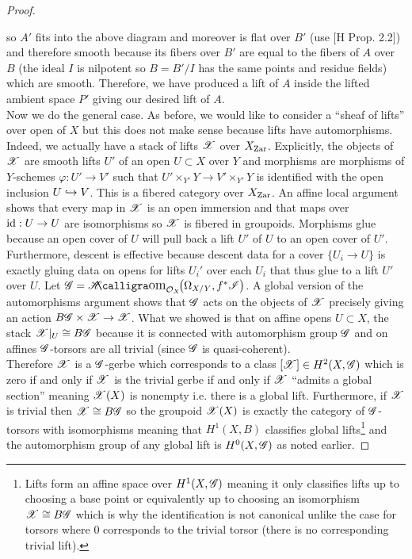 \documentclass[12pt]{article}
\begin{document}
\begin{proof}
\begin{center}
\end{center}
so $A'$ fits into the above diagram and moreover is flat over $B'$ (use [H Prop. 2.2]) and therefore smooth because its fibers over $B'$ are equal to the fibers of $A$ over $B$ (the ideal $I$ is nilpotent so $B = B'/I$ has the same points and residue fields) which are smooth. Therefore, we have produced a lift of $A$ inside the lifted ambient space $P'$ giving our desired lift of $A$. 
\bigskip\\
Now we do the general case. As before, we would like to consider a ``sheaf of lifts'' over open of $X$ but this does not make sense because lifts have automorphisms. Indeed, we actually have a stack of lifts $\mathscr{X}$ over $X_{\mathrm{Zar}}$. Explicitly, the objects of $\mathscr{X}$ are smooth lifts $U'$ of an open $U \subset X$ over $Y$ and morphisms are morphisms of $Y$-schemes $\varphi : U' \to V'$ such that $U' \times_{Y'} Y \to V' \times_{Y'} Y$ is identified with the open inclusion $U \hookrightarrow V$. This is a fibered category over $X_{\mathrm{Zar}}$. An affine local argument shows that every map in $\mathscr{X}$ is an open immersion and that maps over $\mathrm{id} : U \to U$ are isomorphisms so $\mathscr{X}$ is fibered in groupoids. Morphisms glue because an open cover of $U$ will pull back a lift $U'$ of $U$ to an open cover of $U'$. Furthermore, descent is effective because descent data for a cover $\{ U_i \to U \}$ is exactly gluing data on opens for lifts $U_i'$ over each $U_i$ that thus glue to a lift $U'$ over $U$. Let $\G = \shHom{\struct{X}}{\Omega_{X/Y}}{f^* \I}$. A global version of the automorphisms argument shows that $\mathscr{G}$ acts on the objects of $\mathscr{X}$ precisely giving an action $B \mathscr{G} \times \mathscr{X} \to \mathscr{X}$. What we showed is that on affine opens $U \subset X$, the stack $\mathscr{X}|_U \cong B \mathscr{G}$ because it is connected with automorphism group $\mathscr{G}$ and on affines $\mathscr{G}$-torsors are all trivial (since $\mathscr{G}$ is quasi-coherent).
\bigskip\\
Therefore $\mathscr{X}$ is a $\mathscr{G}$-gerbe which corresponds to a class $[\mathscr{X}] \in H^2(X, \mathscr{G})$ which is zero if and only if $\mathscr{X}$ is the trivial gerbe if and only if $\mathscr{X}$ ``admits a global section'' meaning $\mathscr{X}(X)$ is nonempty i.e. there is a global lift. Furthermore, if $\mathscr{X}$ is trivial then $\mathscr{X} \cong B \mathscr{G}$ so the groupoid $\mathscr{X}(X)$ is exactly the category of $\mathscr{G}$-torsors with isomorphisms meaning that $H^1(X, B)$ classifies global lifts\footnote{Lifts form an affine space over $H^1(X, \mathscr{G})$ meaning it only classifies lifts up to choosing a base point or equivalently up to choosing an isomorphism $\mathscr{X} \cong B \mathscr{G}$ which is why the identification is not canonical unlike the case for torsors where $0$ corresponds to the trivial torsor (there is no corresponding trivial lift).} and the automorphism group of any global lift is $H^0(X, \mathscr{G})$ as noted earlier.

\end{proof}
\end{document}
